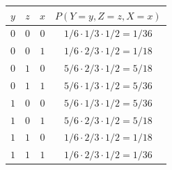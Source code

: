 \documentclass{article}
\begin{document}
\begin{center}
\begin{tabular}{|c|c|c|c|}
    \hline
    $y$ & $z$ & $x$ & $P(Y = y, Z = z, X = x)$ \\
    \hline
    $0$ & $0$ & $0$ & $1/6 \cdot 1/3 \cdot 1/2 = 1/36$ \\
    \hline
    $0$ & $0$ & $1$ & $1/6 \cdot 2/3 \cdot 1/2 = 1/18$ \\
    \hline
    $0$ & $1$ & $0$ & $5/6 \cdot 2/3 \cdot 1/2 = 5/18$ \\
    \hline
    $0$ & $1$ & $1$ & $5/6 \cdot 1/3 \cdot 1/2 = 5/36$ \\
    \hline
    $1$ & $0$ & $0$ & $5/6 \cdot 1/3 \cdot 1/2 = 5/36$ \\
    \hline
    $1$ & $0$ & $1$ & $5/6 \cdot 2/3 \cdot 1/2 = 5/18$ \\
    \hline
    $1$ & $1$ & $0$ & $1/6 \cdot 2/3 \cdot 1/2 = 1/18$ \\
    \hline
    $1$ & $1$ & $1$ & $1/6 \cdot 2/3 \cdot 1/2 = 1/36$ \\
    \hline
\end{tabular}
\end{center}
\end{document}
